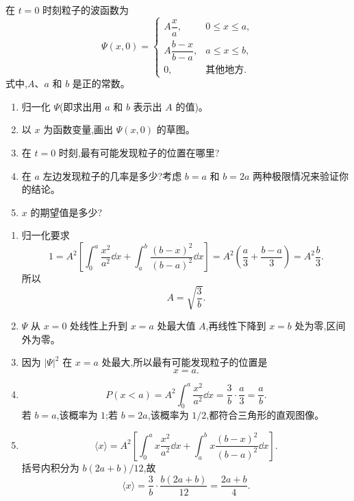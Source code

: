 \begin{question}
在 $t=0$ 时刻粒子的波函数为
\[
\Psi(x,0)=
\begin{cases}
A\dfrac{x}{a}, & 0\le x\le a,\\[0.6em]
A\dfrac{b-x}{b-a}, & a\le x\le b,\\[0.6em]
0, & \text{其他地方}.
\end{cases}
\]
式中,$A$、$a$ 和 $b$ 是正的常数。
\begin{enumerate}
\item 归一化 $\Psi$(即求出用 $a$ 和 $b$ 表示出 $A$ 的值)。
\item 以 $x$ 为函数变量,画出 $\Psi(x,0)$ 的草图。
\item 在 $t=0$ 时刻,最有可能发现粒子的位置在哪里?
\item 在 $a$ 左边发现粒子的几率是多少?考虑 $b=a$ 和 $b=2a$ 两种极限情况来验证你的结论。
\item $x$ 的期望值是多少?
\end{enumerate}
\begin{solution}
\begin{enumerate}
\item 归一化要求
\[
1=A^2\left[\int_0^a\frac{x^2}{a^2}\dd x+
\int_a^b\frac{(b-x)^2}{(b-a)^2}\dd x\right]
=A^2\left(\frac a3+\frac{b-a}{3}\right)
=A^2\frac b3.
\]
所以
\[
A=\sqrt{\frac{3}{b}}.
\]
\item $\Psi$ 从 $x=0$ 处线性上升到 $x=a$ 处最大值 $A$,再线性下降到 $x=b$ 处为零,区间外为零。
\item 因为 $|\Psi|^2$ 在 $x=a$ 处最大,所以最有可能发现粒子的位置是
\[
x=a.
\]
\item
\[
P(x<a)=A^2\int_0^a\frac{x^2}{a^2}\dd x
=\frac{3}{b}\cdot\frac a3=\frac ab.
\]
若 $b=a$,该概率为 $1$;若 $b=2a$,该概率为 $1/2$,都符合三角形的直观图像。
\item
\[
\langle x\rangle=A^2\left[\int_0^a x\frac{x^2}{a^2}\dd x+
\int_a^b x\frac{(b-x)^2}{(b-a)^2}\dd x\right].
\]
括号内积分为 $b(2a+b)/12$,故
\[
\langle x\rangle=\frac{3}{b}\cdot\frac{b(2a+b)}{12}=\frac{2a+b}{4}.
\]
\end{enumerate}
\end{solution}
\end{question}

